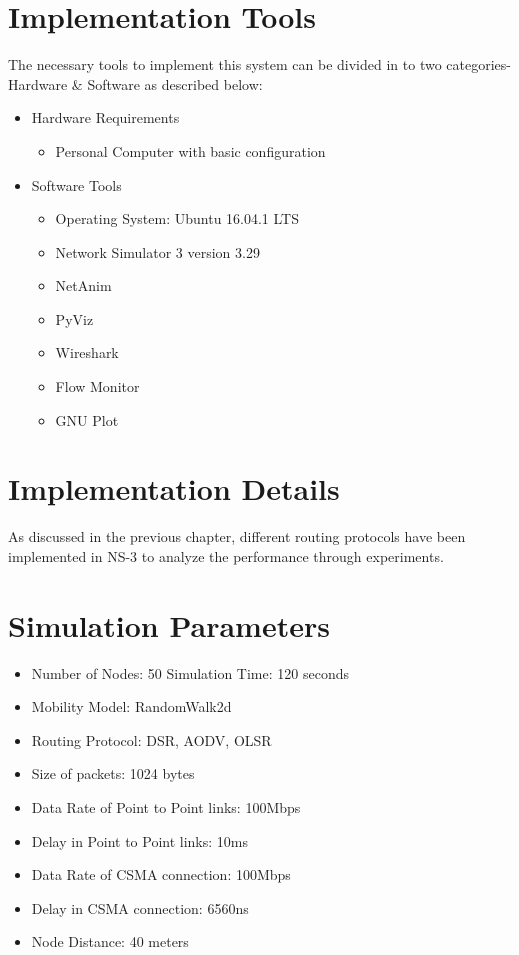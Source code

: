 \documentclass[12pt,a4paper]{report}
\begin{document}
\section{Implementation Tools}
The necessary tools to implement this system can be divided in to two categories-Hardware \& Software as described below:
\begin{itemize}
\item 
Hardware Requirements
\begin{itemize}
\item 
Personal Computer with basic configuration
\end{itemize}
\item 
Software Tools
\begin{itemize}
\item 
Operating System: Ubuntu 16.04.1 LTS
\item 
Network Simulator 3 version 3.29
\item 
NetAnim
\item 
PyViz
\item 
Wireshark
\item 
Flow Monitor
\item 
GNU Plot
\end{itemize}
\end{itemize}
\section{Implementation Details}
As discussed in the previous chapter, different routing protocols have been implemented in NS-3 to analyze the performance through experiments.


\section{Simulation Parameters}
\begin{itemize}
\item 
Number of Nodes: 50
Simulation Time: 120 seconds
\item 
Mobility Model: RandomWalk2d 
\item 
Routing Protocol: DSR, AODV, OLSR
\item 
Size of packets: 1024 bytes
\item 
Data Rate of Point to Point links: 100Mbps
\item
Delay in Point to Point links: 10ms
\item 
Data Rate of CSMA connection: 100Mbps
\item
Delay in CSMA connection: 6560ns
\item
Node Distance: 40 meters
\end{itemize}
\end{document}
